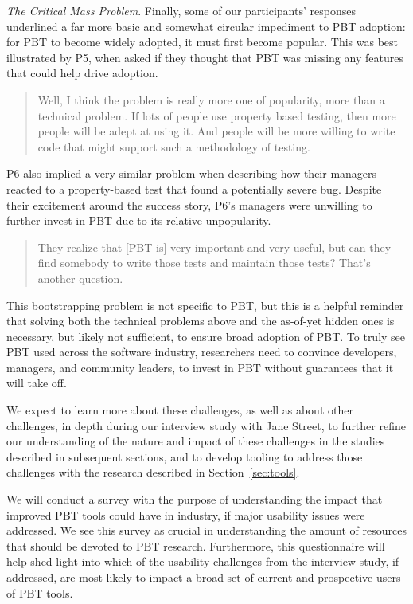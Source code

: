 \textit{The Critical Mass Problem}.
Finally, some of our participants' responses underlined a far more basic and
somewhat circular impediment to PBT adoption: for PBT to become widely adopted, it
must first become popular. This was best illustrated by P5,
when asked if they thought that PBT was missing any features that could help
drive adoption.
\begin{quote}
  Well, I think the problem is really more one of popularity, more than a
  technical problem. If lots of people use property based testing, then more
  people will be adept at using it.  And people will be more willing to write
  code that might support such a methodology of testing.
\end{quote}

P6 also implied a very similar problem when describing
how their managers reacted to a property-based test that found a potentially
severe bug. Despite their excitement around the success story, P6's
managers were unwilling to further invest in PBT due to its relative
unpopularity.
\begin{quote}
  They realize that [PBT is] very important and very useful, but can they find
  somebody to write those tests and maintain those tests? That's another
  question.
\end{quote}

This bootstrapping problem is not specific to PBT, but this is a helpful 
reminder that solving both the
technical problems above and the as-of-yet hidden ones is necessary, but
likely not sufficient, to ensure broad adoption of PBT. To truly see PBT used across the software
industry, researchers need to convince developers, managers, and community
leaders, to invest in PBT without guarantees that it will take off.

We expect to learn more about these challenges, as well as about other challenges,
in depth during our interview study with Jane Street, to further refine our
understanding of the nature and impact of these challenges in the studies
described in subsequent sections, and to develop tooling to address
those challenges with the research described in Section~\ref{sec:tools}.


We will conduct a survey with the purpose of understanding the impact that
improved PBT tools could have in industry, if major usability issues were
addressed. We see this survey as crucial in understanding the amount of
resources that should be devoted to PBT research. Furthermore, this
questionnaire will help shed light into which of the usability challenges from
the interview study, if addressed, are most likely to impact a broad set of
current and prospective users of PBT tools.

